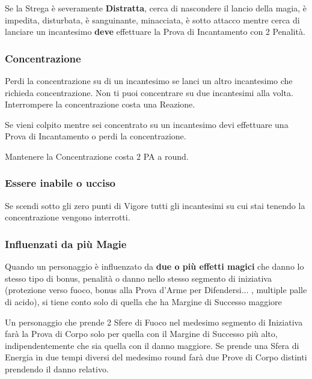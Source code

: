 \documentclass[12pt,a4paper,twoside,openany]{book}
\begin{document}
\begin{multicols}{2}
Se la Strega è severamente \textbf{Distratta}, cerca di nascondere il lancio della magia, è impedita, disturbata, è sanguinante, minacciata, è sotto attacco mentre cerca di lanciare un incantesimo \textbf{deve} effettuare la Prova di Incantamento con 2 Penalità.

\subsubsection{Concentrazione}\label{magieconcentrazione}

Perdi la concentrazione su di un incantesimo se lanci un altro incantesimo che richieda concentrazione. Non ti puoi concentrare su due incantesimi alla volta. Interrompere la concentrazione costa una Reazione.

Se vieni colpito mentre sei concentrato su un incantesimo devi effettuare una Prova di Incantamento o perdi la concentrazione.

Mantenere la Concentrazione costa 2 PA a round.

\subsubsection{Essere inabile o ucciso}\label{magieessereucciso}

Se scendi sotto gli zero punti di Vigore tutti gli incantesimi su cui stai tenendo la concentrazione vengono interrotti.


\subsubsection{Influenzati da più Magie}\label{magieinfluenzatodapiumagie}

Quando un personaggio è influenzato da \textbf{due o più effetti magici} che danno lo stesso tipo di bonus, penalità o danno nello stesso segmento di iniziativa (protezione verso fuoco, bonus alla Prova d'Arme per Difendersi... , multiple palle di acido), si tiene conto solo di quella che ha Margine di Successo maggiore

Un personaggio che prende 2 Sfere di Fuoco nel medesimo segmento di Iniziativa farà la Prova di Corpo solo per quella con il Margine di Successo più alto, indipendentemente che sia quella con il danno maggiore. Se prende una Sfera di Energia in due tempi diversi del medesimo round farà due Prove di Corpo distinti prendendo il danno relativo.


\end{multicols}
\end{document}
